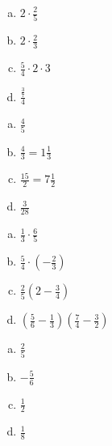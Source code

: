 \begin{tehtava}

\begin{enumerate}[a)]
	\item $2 \cdot \frac{2}{5}$
	\item $2 \cdot \frac{2}{3}$
	\item $\frac{5}{4} \cdot 2 \cdot 3$
	\item $\frac{\frac{3}{7}}{4}$ 
\end{enumerate}
    \begin{vastaus}
		\begin{enumerate}[a)]
			\item $\frac{4}{5}$
			\item $\frac{4}{3} = 1 \frac{1}{3}$
			\item $\frac{15}{2} = 7 \frac{1}{2}$
			\item $\frac{3}{28}$
		\end{enumerate}
    \end{vastaus}
\end{tehtava}

\begin{tehtava}

\begin{enumerate}[a)]
	\item $\frac{1}{3} \cdot \frac{6}{5}$
	\item $\frac{5}{4} \cdot (-\frac{2}{3})$ 
	\item $\frac{2}{5} (2 - \frac{3}{4})$
	\item $(\frac{5}{6} - \frac{1}{3})(\frac{7}{4} - \frac{3}{2})$
\end{enumerate}
    \begin{vastaus}		
		\begin{enumerate}[a)]
			\item $\frac{2}{5}$
			\item $-\frac{5}{6}$
			\item $\frac{1}{2}$
			\item $\frac{1}{8}$ 
		\end{enumerate}
    \end{vastaus}
\end{tehtava}

